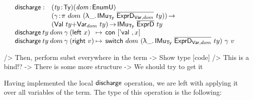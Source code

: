 \[\stk{
\begin{array}{@{}ll}
\discharge : & \PITEL{\V{ty}}{\Ty}
               \PITEL{\V{dom}}{\EnumU} \\
             & \PI{\V{\gamma}}{\spi{dom}{(\LAM{\_} \IMu{\Ty}{\toIDesc{\HExprVarD{dom}}}{ty})}} \\
             & (\SUM{\Val{ty}}{\Var{dom}{ty}}) \To
               \IMu{\Ty}{\toIDesc{\HExprD}}{ty} 
\end{array} \\
\begin{array}{@{}l@{\:\mapsto\:\:}l}
\discharge\: ty\: dom\: \gamma\: (\SumLeft x)  & \Con{\pair{\Eval{}}{x}{}} \\
\discharge\: ty\: dom\: \gamma\: (\SumRight v) & \switch{dom}{(\LAM{\_} \IMu{\Ty}{\toIDesc{\HExprVarD{dom}}}{ty})}{\gamma}{v}
\end{array}
}\]

\begin{wstructure}
            /> Then, perform subst everywhere in the term
                -> Show type [code]
                /> This is a bind!?
                -> There is some more structure 
                    -> We should try to get it
\end{wstructure}

Having implemented the local $\discharge$ operation, we are left with
applying it over all variables of the term. The type of this operation
is the following:

\newcommand{\substH}{\F{substExpr}}
\newcommand{\domNat}{dom_{\CN{nat}}}
\newcommand{\domBool}{dom_{\CN{bool}}}
\newcommand{\gammaNat}{\gamma_{\CN{nat}}}
\newcommand{\gammaBool}{\gamma_{\CN{bool}}}

